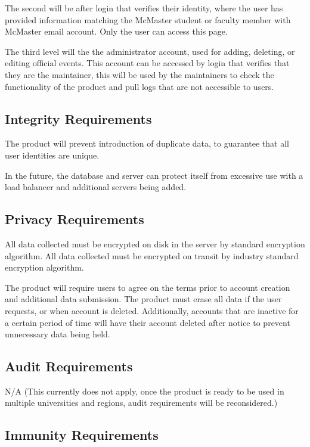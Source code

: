 \documentclass{article}
\begin{document}
The second will be after login that verifies their identity, where the user has provided information matching the McMaster student or faculty member with McMaster email account. Only the user can access this page.

The third level will the the administrator account, used for adding, deleting, or editing official events. This account can be accessed by login that verifies that they are the maintainer, this will be used by the maintainers to check the functionality of the product  and pull logs that are not accessible to users.

\subsection{Integrity Requirements}

The product will prevent introduction of duplicate data, to guarantee that all user identities are unique.

In the future, the database and server can protect itself from excessive use with a load balancer and additional servers being added.

\subsection{Privacy Requirements}

All data collected must be encrypted on disk in the server by standard encryption algorithm.
All data collected must be encrypted on transit by industry standard encryption algorithm.

The product will require users to agree on the terms prior to account creation and additional data submission.
The product must erase all data if the user requests, or when account is deleted.
Additionally, accounts that are inactive for a certain period of time will have their account deleted after notice to prevent unnecessary data being held.

\subsection{Audit Requirements}

N/A (This currently does not apply, once the product is ready to be used in multiple universities and regions, audit requirements will be reconsidered.)

\subsection{Immunity Requirements}
\end{document}
